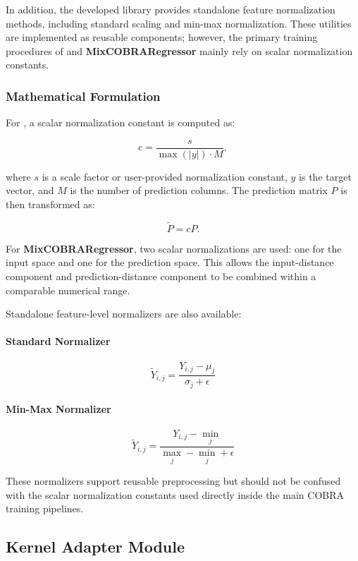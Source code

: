 In addition, the developed library provides standalone feature normalization methods, including standard scaling and min-max normalization. These utilities are implemented as reusable components; however, the primary training procedures of \GradientCOBRA{} and \textbf{MixCOBRARegressor} mainly rely on scalar normalization constants.


\subsubsection*{Mathematical Formulation}

For \GradientCOBRA{}, a scalar normalization constant is computed as:

\[
    c = \frac{s}{\max(|y|) \cdot M},
\]

where $s$ is a scale factor or user-provided normalization constant, $y$ is the target vector, and $M$ is the number of prediction columns. The prediction matrix $P$ is then transformed as:

\[
    \tilde{P} = cP.
\]

For \textbf{MixCOBRARegressor}, two scalar normalizations are used: one for the input space and one for the prediction space. This allows the input-distance component and prediction-distance component to be combined within a comparable numerical range.

Standalone feature-level normalizers are also available:

\paragraph{Standard Normalizer}
\[
    \tilde{Y}_{i,j} = \frac{Y_{i,j} - \mu_j}{\sigma_j + \epsilon}
\]

\paragraph{Min-Max Normalizer}
\[
    \tilde{Y}_{i,j} = \frac{Y_{i,j} - \min_j}{\max_j - \min_j + \epsilon}
\]

These normalizers support reusable preprocessing but should not be confused with the scalar normalization constants used directly inside the main COBRA training pipelines.

\subsection{Kernel Adapter Module}
\label{subsec:kernel_adapter_module}

